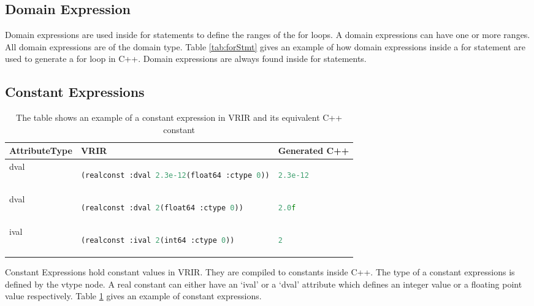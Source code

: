\subsection{Domain Expression}
Domain expressions are used inside for statements to define the ranges of the for loops. A domain expressions can have one or more ranges. All domain expressions are of the domain type. Table \ref{tab:forStmt} gives an example of how domain expressions inside a for statement are used to generate a for loop in C++. Domain expressions are always found inside for statements. 
\subsection{Constant Expressions}
\begin{table}[htbp]
\centering
\begin{tabular}{|l|l|l|}
\hline

AttributeType & VRIR &  Generated C++ \\
\hline
dval &
{
\begin{lstlisting}[language=lisp,frame=none, numbers=none]
(realconst :dval 2.3e-12(float64 :ctype 0))
\end{lstlisting}
}
&
{
\begin{lstlisting}[language=c,frame=none, numbers=none]
2.3e-12
\end{lstlisting}
} \\
\hline
dval &
{
\begin{lstlisting}[language=lisp,frame=none, numbers=none]
(realconst :dval 2(float64 :ctype 0))
\end{lstlisting}
}
&
{
\begin{lstlisting}[language=c,frame=none, numbers=none]
2.0f
\end{lstlisting}
} \\
\hline
ival &
{
\begin{lstlisting}[language=lisp,frame=none, numbers=none]
(realconst :ival 2(int64 :ctype 0))
\end{lstlisting}
}
&
{
\begin{lstlisting}[language=c,frame=none, numbers=none]
2
\end{lstlisting}
} \\
\hline
\end{tabular}
\caption[Constant Expression example]{The table shows an example of a constant expression in VRIR and its equivalent C++ constant}
\label{tab:constExpr}
\end{table}
Constant Expressions hold constant values in VRIR. They are compiled to constants inside C++. The type of a constant expressions is defined by the vtype node. A real constant can either have an `ival' or a `dval' attribute which defines an integer value or a floating point value respectively. Table \ref{tab:constExpr} gives an example of constant expressions.
